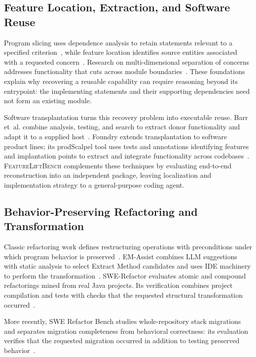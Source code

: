 \documentclass[acmsmall,screen,review,anonymous]{acmart}
\newcommand{\flb}{\textsc{FeatureLiftBench}\xspace}
\begin{document}
\subsection{Feature Location, Extraction, and Software Reuse}

Program slicing uses dependence analysis to retain statements relevant to a
specified criterion~\cite{weiser1984slicing}, while feature location identifies
source entities associated with a requested concern~\cite{dit2013featurelocation}.
Research on multi-dimensional separation of concerns addresses functionality
that cuts across module boundaries~\cite{tarr1999degrees}. These foundations
explain why recovering a reusable capability can require reasoning beyond its
entrypoint: the implementing statements and their supporting dependencies need
not form an existing module.

Software transplantation turns this recovery problem into executable reuse.
Barr et~al. combine analysis, testing, and search to extract donor functionality
and adapt it to a supplied host~\cite{barr2015transplantation}. Foundry extends
transplantation to software product lines; its prodScalpel tool uses tests and
annotations identifying features and implantation points to extract and
integrate functionality across codebases~\cite{souza2025foundry}.
\flb complements these techniques by evaluating end-to-end reconstruction into
an independent package, leaving localization and implementation strategy to a
general-purpose coding agent.

\subsection{Behavior-Preserving Refactoring and Transformation}

Classic refactoring work defines restructuring operations with preconditions
under which program behavior is preserved~\cite{opdyke1992refactoring}.
EM-Assist combines LLM suggestions with static analysis to
select Extract Method candidates and uses IDE machinery to perform the
transformation~\cite{pomian2024emassist}. SWE-Refactor evaluates atomic and
compound refactorings mined from real Java projects. Its verification combines
project compilation and tests with checks that the requested structural
transformation occurred~\cite{xu2026swerefactor}.

More recently, SWE Refactor Bench studies whole-repository stack migrations and
separates migration completeness from behavioral correctness: its evaluation
verifies that the requested migration occurred in addition to testing preserved
behavior~\cite{hong2026swerefactorbench}.
\end{document}

